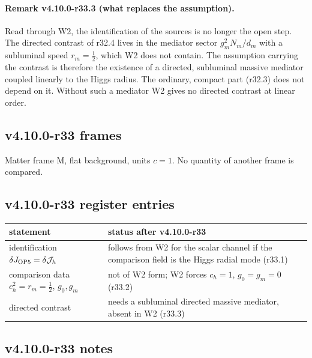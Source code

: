 \paragraph{Remark v4.10.0-r33.3 (what replaces the assumption).}
Read through W2, the identification of the sources is no longer the open step.  The directed contrast of r32.4 lives in the mediator
sector \(g_m^2N_m/d_m\) with a subluminal speed \(r_m=\tfrac12\), which W2 does not contain.  The assumption carrying the contrast is therefore
the existence of a directed, subluminal massive mediator coupled linearly to the Higgs radius.  The ordinary, compact part (r32.3) does
not depend on it.  Without such a mediator W2 gives no directed contrast at linear order.

\subsection*{v4.10.0-r33 frames}
\label{subsec:v4100-r33-frames}

Matter frame M, flat background, units \(c=1\).  No quantity of another frame is compared.

\subsection*{v4.10.0-r33 register entries}
\label{subsec:v4100-r33-register}

\begin{center}
\small
\begin{tabular}{@{}>{\raggedright\arraybackslash}p{}>{\raggedright\arraybackslash}p{}@{}}
\toprule
statement & status after v4.10.0-r33\\
\midrule
identification \(\delta J_{\rm OP5}=\delta\mathcal J_h\) & follows from W2 for the scalar channel if the comparison field is the Higgs radial mode (r33.1)\\
comparison data \(c_h^2=r_m=\tfrac12\), \(g_0,g_m\) & not of W2 form; W2 forces \(c_h=1\), \(g_0=g_m=0\) (r33.2)\\
directed contrast & needs a subluminal directed massive mediator, absent in W2 (r33.3)\\
\bottomrule
\end{tabular}
\end{center}

\subsection*{v4.10.0-r33 notes}
\label{subsec:v4100-r33-notes}

